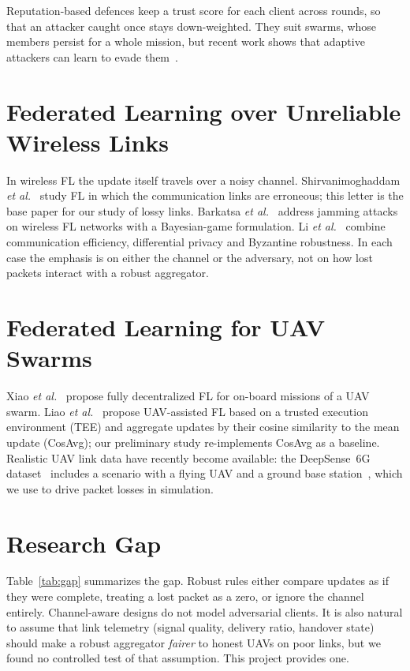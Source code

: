 Reputation-based defences keep a trust score for each client across rounds, so that
an attacker caught once stays down-weighted. They suit swarms, whose members persist
for a whole mission, but recent work shows that adaptive attackers can learn to evade
them~\cite{liu2026evade}.

\section{Federated Learning over Unreliable Wireless Links}
In wireless FL the update itself travels over a noisy channel. Shirvanimoghaddam
\textit{et al.}~\cite{shirvanimoghaddam2022erroneous} study FL in which the
communication links are erroneous; this letter is the base paper for our study of
lossy links. Barkatsa \textit{et al.}~\cite{barkatsa2024jamming} address jamming
attacks on wireless FL networks with a Bayesian-game formulation. Li
\textit{et al.}~\cite{li2022dpbyz} combine communication efficiency, differential
privacy and Byzantine robustness. In each case the emphasis is on either the channel
or the adversary, not on how lost packets interact with a robust aggregator.

\section{Federated Learning for UAV Swarms}
Xiao \textit{et al.}~\cite{xiao2021uavswarm} propose fully decentralized FL for
on-board missions of a UAV swarm. Liao \textit{et al.}~\cite{liao2023tee} propose
UAV-assisted FL based on a trusted execution environment (TEE) and aggregate updates
by their cosine similarity to the mean update (CosAvg); our preliminary study
re-implements CosAvg as a baseline. Realistic UAV link data have recently become
available: the DeepSense~6G dataset~\cite{alkhateeb2023deepsense} includes a
scenario with a flying UAV and a ground base station~\cite{charan2025drone}, which we
use to drive packet losses in simulation.

\section{Research Gap}
Table~\ref{tab:gap} summarizes the gap. Robust rules either compare updates as if
they were complete, treating a lost packet as a zero, or ignore the channel entirely.
Channel-aware designs do not model adversarial clients. It is also natural to assume
that link telemetry (signal quality, delivery ratio, handover state) should make a
robust aggregator \emph{fairer} to honest UAVs on poor links, but we found no
controlled test of that assumption. This project provides one.

